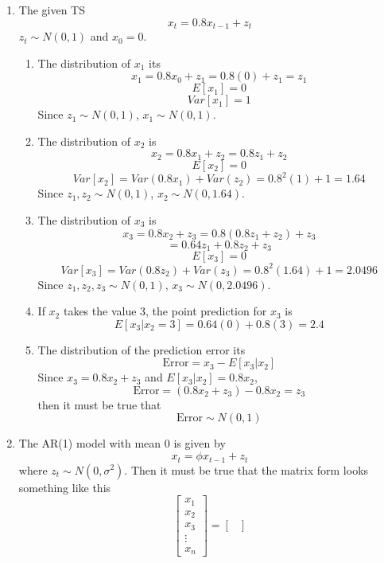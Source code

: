 \documentclass[12pt]{article}
\begin{document}
\begin{enumerate}
\begin{enumerate}
\begin{enumerate}
\begin{center}
            \end{center}
        \end{enumerate}
    \end{enumerate}
    \item The given TS
    \[ x_t = 0.8x_{t-1} + z_t \]
    $z_t \sim N(0, 1)$ and $x_0 = 0$.
    \begin{enumerate}
        \item The distribution of $x_1$ its
        \[ x_1 = 0.8x_0 + z_1 = 0.8(0) + z_1 = z_1 \]
        \[ E[x_1] = 0 \]
        \[ Var[x_1] = 1 \]
        Since $z_1 \sim N(0, 1)$, $x_1 \sim N(0, 1)$.
        \item The distribution of $x_2$ is
        \[ x_2 = 0.8x_1 + z_2 = 0.8z_1 + z_2 \]
        \[ E[x_2] = 0 \]
        \[ 
        Var[x_2] = Var(0.8x_1) + Var(z_2) 
        = 0.8^2(1) + 1 = 1.64 
        \]
        Since $z_1, z_2 \sim N(0, 1)$, $x_2 \sim N(0, 1.64)$.
        \item The distribution of $x_3$ is
        \[ x_3 = 0.8x_2 + z_3 = 0.8(0.8z_1 + z_2) + z_3 \]
        \[ = 0.64z_1 + 0.8z_2 + z_3 \]
        \[ E[x_3] = 0 \]
        \[ 
        Var[x_3] = Var(0.8z_2) + Var(z_3) 
        =  0.8^2(1.64) + 1 = 2.0496 
        \]
        Since $z_1, z_2, z_3 \sim N(0, 1)$, $x_3 \sim N(0, 2.0496)$.
        \item If $x_2$ takes the value 3, the point prediction for $x_3$ is
        \[ E[x_3 | x_2 = 3] = 0.64(0) + 0.8(3) = 2.4 \]
        \item The distribution of the prediction error its
        \[ \text{Error} = x_3 - E[x_3 | x_2] \]
        Since $x_3 = 0.8x_2 + z_3$ and $E[x_3 | x_2] = 0.8x_2$,
        \[ \text{Error} = (0.8x_2 + z_3) - 0.8x_2 = z_3 \]
        then it must be true that 
        \[ \text{Error} \sim N(0, 1) \]
    \end{enumerate}
    \item \begin{enumerate}
        The AR(1) model with mean 0 is given by
    \[ x_t = \phi x_{t-1} + z_t \]
    where $z_t \sim N(0, \sigma^2)$.
    Then it must be true that the matrix form looks something like this
    \[
    \begin{bmatrix}
        x_1 \\
        x_2 \\
        x_3 \\
        \vdots \\
        x_n
    \end{bmatrix}
    =
    \begin{bmatrix}

\end{bmatrix}\]
\end{enumerate}
\end{enumerate}
\end{document}
